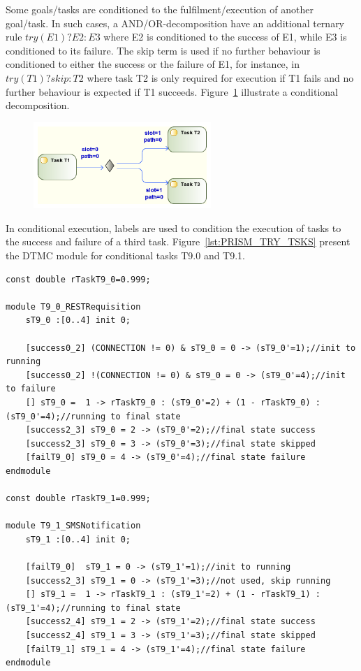 Some goals/tasks are conditioned to the fulfilment/execution of another goal/task. In such cases, a AND/OR-decomposition have an additional ternary rule $try(E1)?E2:E3$ where E2 is conditioned to the success of E1, while E3 is conditioned to its failure. The skip term is used if no further behaviour is conditioned to either the success or the failure of E1, for instance, in $try(T1)?skip:T2$ where task T2 is only required for execution if T1 fails and no further behaviour is expected if T1 succeeds. Figure~\ref{fig:UML_TRY_TSKS} illustrate a conditional decomposition.

\begin{figure}[ht!]
\centering
\includegraphics[width=0.60\textwidth]{imgs/UML_TRY_TSKS.png}
\caption{}
\label{fig:UML_TRY_TSKS}
\end{figure}

In conditional execution, labels are used to condition the execution of tasks to the success and failure of a third task. Figure~\ref{lst:PRISM_TRY_TSKS} present the DTMC module for conditional tasks T9.0 and T9.1. 
\medskip

\begin{lstlisting}[language=Prism, caption={Conditional tasks T9.00 and T9.1 as DTMC modules.},label={lst:PRISM_TRY_TSKS}] 
const double rTaskT9_0=0.999;

module T9_0_RESTRequisition
	sT9_0 :[0..4] init 0;
	
	[success0_2] (CONNECTION != 0) & sT9_0 = 0 -> (sT9_0'=1);//init to running
	[success0_2] !(CONNECTION != 0) & sT9_0 = 0 -> (sT9_0'=4);//init to failure
	[] sT9_0 =  1 -> rTaskT9_0 : (sT9_0'=2) + (1 - rTaskT9_0) : (sT9_0'=4);//running to final state
	[success2_3] sT9_0 = 2 -> (sT9_0'=2);//final state success
	[success2_3] sT9_0 = 3 -> (sT9_0'=3);//final state skipped
	[failT9_0] sT9_0 = 4 -> (sT9_0'=4);//final state failure
endmodule

const double rTaskT9_1=0.999;

module T9_1_SMSNotification
	sT9_1 :[0..4] init 0;
	
	[failT9_0]  sT9_1 = 0 -> (sT9_1'=1);//init to running
	[success2_3] sT9_1 = 0 -> (sT9_1'=3);//not used, skip running
	[] sT9_1 =  1 -> rTaskT9_1 : (sT9_1'=2) + (1 - rTaskT9_1) : (sT9_1'=4);//running to final state
	[success2_4] sT9_1 = 2 -> (sT9_1'=2);//final state success
	[success2_4] sT9_1 = 3 -> (sT9_1'=3);//final state skipped
	[failT9_1] sT9_1 = 4 -> (sT9_1'=4);//final state failure
endmodule
\end{lstlisting}


